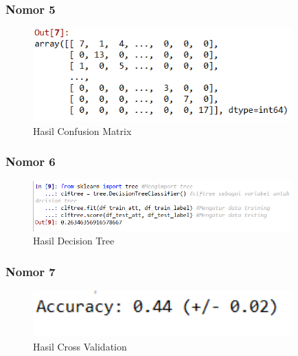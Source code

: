 \subsubsection{Nomor 5}
\hfill\break

\begin{figure}[H]
\centerline{\includegraphics[width=10cm]{figures/1174084/3/8.png}}
\caption{Hasil Confusion Matrix}
\label{labelgambar}
\end{figure}

\subsubsection{Nomor 6}
\hfill\break

\begin{figure}[H]
\centerline{\includegraphics[width=10cm]{figures/1174084/3/9.png}}
\caption{Hasil Decision Tree}
\label{labelgambar}
\end{figure}

\subsubsection{Nomor 7}
\hfill\break

\begin{figure}[H]
\centerline{\includegraphics[width=10cm]{figures/1174084/3/10.png}}
\caption{Hasil Cross Validation}
\label{labelgambar}
\end{figure}

